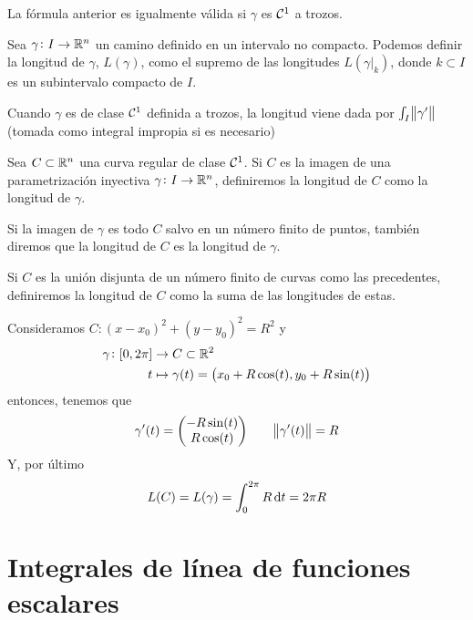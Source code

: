 \begin{obs}
    La fórmula anterior es igualmente válida si $\gamma$ es $\mathcal{C}^1$ a trozos.
\end{obs}

\begin{defi}
    Sea $\gamma \colon I \to \mathbb{R}^n$ un camino definido en un intervalo no compacto. Podemos definir la longitud de $\gamma$, $L(\gamma)$,
    como el supremo de las longitudes $L(\gamma\vert_{k})$, donde $k \subset I$ es un subintervalo compacto de $I$.

    Cuando $\gamma$ es de clase $\mathcal{C}^1$ definida a trozos, la longitud viene dada por $\int_I \norm{\gamma^\prime}$ (tomada como integral impropia
    si es necesario)
\end{defi}


\begin{defi} \label{defi:observaciones_curvas}
    Sea $C \subset \mathbb{R}^n$ una curva regular de clase $\mathcal{C}^1$. Si $C$ es la imagen de una parametrización inyectiva $\gamma \colon I \to \mathbb{R}^n$,
    definiremos la longitud de $C$ como la longitud de $\gamma$.

    Si la imagen de $\gamma$ es todo $C$ salvo en un número finito de puntos, tambi\'en diremos que la longitud de $C$ es la longitud de $\gamma$.

    Si $C$ es la unión disjunta de un número finito de curvas como las precedentes, definiremos la longitud de $C$ como la suma de las longitudes
    de estas.
\end{defi}

\begin{example}
    Consideramos $C \colon \left( x - x_0 \right)^2 + \left( y - y_0 \right)^2 = R^2$ y
    \[
        \begin{aligned}
            \gamma \colon [0,2\pi] &\to C \subset \mathbb{R}^2 \\
            t &\mapsto \gamma(t) = \left( x_0 + R\cos(t), y_0 + R\sin(t) \right)
        \end{aligned}
    \]
    entonces, tenemos que
    \[
        \gamma^\prime(t) = \begin{pmatrix} -R\sin(t) \\ R \cos(t) \end{pmatrix} \qquad
        \norm{\gamma^\prime(t)} = R
    \]
    Y, por último
    \[
        L(C) = L(\gamma) = \int^{2\pi}_0 R \dif t = 2\pi R
    \]
\end{example}

\section{Integrales de línea de funciones escalares}


